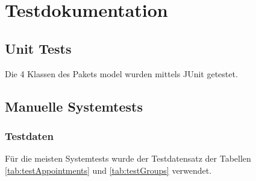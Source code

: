 \newcommand{\testBookInvalidStartTime}{
\testCase{Teilsystem Termine anzeigen und buchen}
  {Termin buchen}
  {Termin 26.7. aus Testdatensatz, Startzeit 11:00}
  {Startzeit ist außerhalb des Zeitfensters, angemeldete Gruppe  hat noch nicht gebucht}
  {Fehlermeldung, da Startzeit nicht in Zeitfenster}
}

\newcommand{\testBookReservedByOther}{
\testCase{Teilsystem Termine anzeigen und buchen}
  {Termin buchen}
  {Termin 12.7. aus Testdatensatz, Startzeit 11:00}
  {Angemeldet als Gruppe 7, Termin ist durch Gruppe 2 reserviert}
  {Fehlermeldung, da durch andere Gruppe reserviert}
}

\section{Testdokumentation}

\subsection{Unit Tests}
Die 4 Klassen des Pakets model wurden mittels JUnit getestet.

\subsection{Manuelle Systemtests}
\subsubsection{Testdaten}
Für die meisten Systemtests wurde der Testdatensatz der Tabellen \ref{tab:testAppointments} und \ref{tab:testGroups} verwendet.

